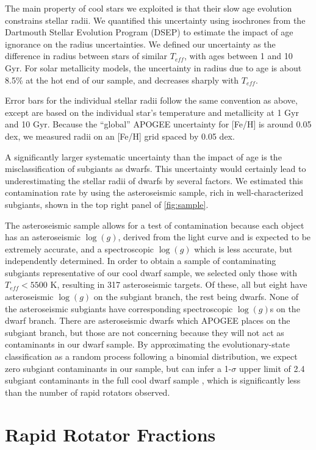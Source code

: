 \documentclass[manuscript]{aastex6}
\newcommand{\Teff}{\ensuremath{T_{eff}}}
\newcommand{\logg}{\ensuremath{\log(g)}}
\begin{document}
The main property of cool stars we exploited is that their slow age evolution
constrains stellar radii. We quantified this uncertainty using isochrones from 
the Dartmouth Stellar Evolution Program (DSEP) to estimate the impact of age 
ignorance on the radius uncertainties. We defined our uncertainty as the 
difference in radius between stars of similar \Teff{}, with ages between 1 
and 10 Gyr. For solar metallicity models, the uncertainty in radius due to 
age is about 8.5\% at the hot end of our sample, and decreases sharply with 
\Teff. 

Error bars for the individual stellar radii follow the same convention as
above, except are based on the individual star's temperature and metallicity 
at 1 Gyr and 10 Gyr. Because the ``global'' APOGEE uncertainty for [Fe/H] is 
around 0.05 dex, we measured radii on an [Fe/H] grid spaced by 0.05 dex.

A significantly larger systematic uncertainty than the impact of age is the 
misclassification of
subgiants as dwarfs. This uncertainty would certainly lead to underestimating
the stellar radii of dwarfs by several factors. We estimated this
contamination rate by using the asteroseismic sample, rich in
well-characterized subgiants, shown in the top right
panel of \cref{fig:sample}.

The asteroseismic sample allows for a test of contamination because each
object has an asteroseismic \logg{}, derived from the light curve and is
expected to be extremely accurate, and a spectroscopic \logg{} which is
less accurate, but independently determined. In order to obtain a sample of 
contaminating subgiants representative of our cool dwarf sample, we
selected only those with \(\Teff < 5500\) K, resulting in 317
asteroseismic targets. Of these, all but eight have asteroseismic \logg{} on 
the subgiant branch, the rest being dwarfs. None of the asteroseismic
subgiants have corresponding spectroscopic \logg{}s on the 
dwarf branch. There are asteroseismic dwarfs which APOGEE places on the
subgiant branch, but those are not concerning because they will not act as 
contaminants in our dwarf sample. By approximating the evolutionary-state 
classification as a random process following a binomial distribution, we
expect zero subgiant contaminants in our sample, but can infer a 1-\(\sigma\) 
upper limit of 2.4 subgiant contaminants in the full cool dwarf sample
\citep{Gehrels86}, which is significantly less than the number of rapid
rotators observed. 

\section{Rapid Rotator Fractions}
\label{sec:fraction}
\end{document}
